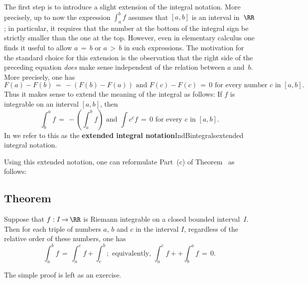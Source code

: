         The first step is to introduce a slight extension of the integral notation. More precisely, up to now the expression ${\displaystyle \int_{a}^{b} f}$ assumes that $[a,b]$ is an interval in~${\RR}$;
    in particular, it requires that the number at the bottom of the integral sign be strictly smaller than the one at the top.
    However, even in elementary calculus one finds it useful to allow $a \,=\, b$ or $a\,>\,b$ in such expressions.
    The motivation for the standard choice for this extension is the observation that the right side of the preceding equation {\em does} make sense independent of the relation between $a$ and~$b$.
    More precisely, one has
        \begin{displaymath}
        F(a) - F(b) \,=\, -(F(b) - F(a)) \mbox{ and } F(c) - F(c)\,=\,0 \mbox{ for every number $c$ in~$[a,b]$}.
        \end{displaymath}
    Thus it makes sense to extend the meaning of the integral as follows: If $f$ is integrable on an interval $[a,b]$, then
        \begin{displaymath}
        \int_{b}^{a} f \,=\, -\left(\int_{a}^{b} f\right) \mbox{ and } \int{c}^{c} f\,=\,0 \mbox{ for every $c$ in $[a,b]$}.
        \end{displaymath}
    In {\ThisText} we refer to this as the {\bf extended integral notation}IndB{integrals}{extended integral notation}.

\V

        Using this extended notation, one can reformulate Part~(c) of Theorem~ as follows:


        \subsection{\small{{\bf Theorem}}}
        \label{ThmH40.15}

        Suppose that $f:I \,{\rightarrow}\, {\RR}$ is Riemann integrable on a closed bounded interval~$I$.
    Then for each triple of numbers $a$, $b$ and $c$ in the interval $I$, regardless of the relative order of these numbers, one has
        \begin{displaymath}
        \int_{a}^{b} f \,=\, \int_{a}^{c} f + \int_{c}^{b};
    \mbox{ equivalently, }
        \int_{a}^{c} f +  + \int_{b}^{a} f \,=\, 0.
        \end{displaymath}

        The simple proof is left as an exercise. %

\VV

